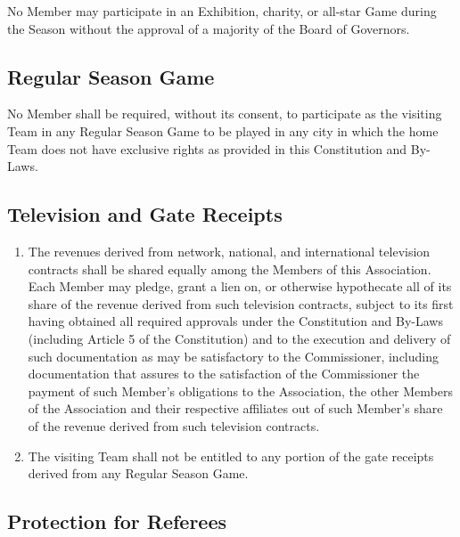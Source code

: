 \documentclass[]{book}
\providecommand{\tightlist}{%
  \setlength{\itemsep}{0pt}\setlength{\parskip}{0pt}}
\theoremstyle{definition}
\theoremstyle{definition}
\theoremstyle{definition}
\theoremstyle{remark}
\begin{document}
No Member may participate in an Exhibition, charity, or all-star Game
during the Season without the approval of a majority of the Board of
Governors.

\subsection{Regular Season Game}\label{regular-season-game}

No Member shall be required, without its consent, to participate as the
visiting Team in any Regular Season Game to be played in any city in
which the home Team does not have exclusive rights as provided in this
Constitution and By-Laws.

\subsection{Television and Gate
Receipts}\label{television-and-gate-receipts}

\begin{enumerate}
\def\labelenumi{(\alph{enumi})}
\tightlist
\item
  The revenues derived from network, national, and international
  television contracts shall be shared equally among the Members of this
  Association. Each Member may pledge, grant a lien on, or otherwise
  hypothecate all of its share of the revenue derived from such
  television contracts, subject to its first having obtained all
  required approvals under the Constitution and By-Laws (including
  Article 5 of the Constitution) and to the execution and delivery of
  such documentation as may be satisfactory to the Commissioner,
  including documentation that assures to the satisfaction of the
  Commissioner the payment of such Member's obligations to the
  Association, the other Members of the Association and their respective
  affiliates out of such Member's share of the revenue derived from such
  television contracts.
\item
  The visiting Team shall not be entitled to any portion of the gate
  receipts derived from any Regular Season Game.
\end{enumerate}

\subsection{Protection for Referees}\label{protection-for-referees}
\end{document}
